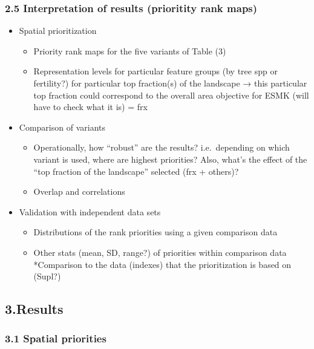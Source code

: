\documentclass[]{article}
\begin{document}
\subsubsection{2.5 Interpretation of results (prioritity rank maps)}

\begin{itemize}
\itemsep1pt\parskip0pt
\item
  Spatial prioritization

  \begin{itemize}
  \itemsep1pt\parskip0pt
  \item
    Priority rank maps for the five variants of Table (3)
  \item
    Representation levels for particular feature groups (by tree spp or
    fertility?) for particular top fraction(s) of the landscape → this
    particular top fraction could correspond to the overall area
    objective for ESMK (will have to check what it is) = frx
  \end{itemize}
\item
  Comparison of variants

  \begin{itemize}
  \itemsep1pt\parskip0pt
  \item
    Operationally, how ``robust'' are the results? i.e.~depending on
    which variant is used, where are highest priorities? Also, what's
    the effect of the ``top fraction of the landscape'' selected (frx +
    others)?
  \item
    Overlap and correlations
  \end{itemize}
\item
  Validation with independent data sets

  \begin{itemize}
  \itemsep1pt\parskip0pt
  \item
    Distributions of the rank priorities using a given comparison data
  \item
    Other stats (mean, SD, range?) of priorities within comparison data
    *Comparison to the data (indexes) that the prioritization is based
    on (Supl?)
  \end{itemize}
\end{itemize}

\subsection{3.Results}

\subsubsection{3.1 Spatial priorities}
\end{document}
